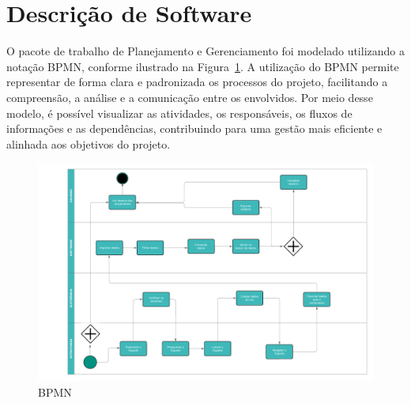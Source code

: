 \section{Descrição de Software}

O pacote de trabalho de Planejamento e Gerenciamento foi modelado utilizando a notação BPMN, conforme ilustrado na Figura~\ref{fig_bpmn}. A utilização do BPMN permite representar de forma clara e padronizada os processos do projeto, facilitando a compreensão, a análise e a comunicação entre os envolvidos. Por meio desse modelo, é possível visualizar as atividades, os responsáveis, os fluxos de informações e as dependências, contribuindo para uma gestão mais eficiente e alinhada aos objetivos do projeto.

\begin{figure}[H]
\centering
\includegraphics[width=15cm]{figuras/bpmn.png}
\caption{BPMN}
\label{fig_bpmn}
\end{figure}


